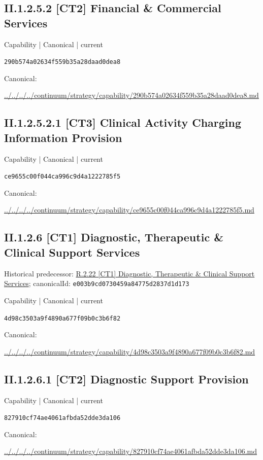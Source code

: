 \documentclass[10pt,a4paper]{article}
\begin{document}
\subsection*{II.1.2.5.2 [CT2] Financial \& Commercial Services}
\label{element-290b574a02634f559b35a28daad0dea8}
{\small Capability | Canonical | current}\par
\texttt{290b574a02634f559b35a28daad0dea8}\par
Canonical: \par
{\footnotesize\url{../../../../continuum/strategy/capability/290b574a02634f559b35a28daad0dea8.md}}\par
\subsection*{II.1.2.5.2.1 [CT3] Clinical Activity Charging Information Provision}
\label{element-ce9655c00f044ca996c9d4a1222785f5}
{\small Capability | Canonical | current}\par
\texttt{ce9655c00f044ca996c9d4a1222785f5}\par
Canonical: \par
{\footnotesize\url{../../../../continuum/strategy/capability/ce9655c00f044ca996c9d4a1222785f5.md}}\par
\subsection*{II.1.2.6 [CT1] Diagnostic, Therapeutic \& Clinical Support Services}
Historical predecessor: \hyperref[element-e003b9cd0730459a84775d2837d1d173]{R.2.22 [CT1] Diagnostic, Therapeutic \& Clinical Support Services}; canonicalId: \texttt{e003b9cd0730459a84775d2837d1d173}\par
\label{element-4d98c3503a9f4890a677f09b0c3b6f82}
{\small Capability | Canonical | current}\par
\texttt{4d98c3503a9f4890a677f09b0c3b6f82}\par
Canonical: \par
{\footnotesize\url{../../../../continuum/strategy/capability/4d98c3503a9f4890a677f09b0c3b6f82.md}}\par
\subsection*{II.1.2.6.1 [CT2] Diagnostic Support Provision}
\label{element-827910cf74ae4061afbda52dde3da106}
{\small Capability | Canonical | current}\par
\texttt{827910cf74ae4061afbda52dde3da106}\par
Canonical: \par
{\footnotesize\url{../../../../continuum/strategy/capability/827910cf74ae4061afbda52dde3da106.md}}\par
\end{document}
